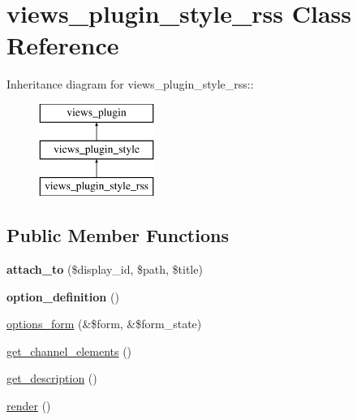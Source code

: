 \hypertarget{classviews__plugin__style__rss}{
\section{views\_\-plugin\_\-style\_\-rss Class Reference}
\label{classviews__plugin__style__rss}
}
Inheritance diagram for views\_\-plugin\_\-style\_\-rss::\begin{figure}[H]
\begin{center}
\leavevmode
\includegraphics[height=3cm]{classviews__plugin__style__rss}
\end{center}
\end{figure}
\subsection*{Public Member Functions}
\begin{DoxyCompactItemize}
\item 
\hypertarget{classviews__plugin__style__rss_a9cd5c1f8c310e28c6e6f99d4fc4ed295}{
{\bfseries attach\_\-to} (\$display\_\-id, \$path, \$title)}
\label{classviews__plugin__style__rss_a9cd5c1f8c310e28c6e6f99d4fc4ed295}

\item 
\hypertarget{classviews__plugin__style__rss_ab65464713d5256b32dbb4eea3e6d76ed}{
{\bfseries option\_\-definition} ()}
\label{classviews__plugin__style__rss_ab65464713d5256b32dbb4eea3e6d76ed}

\item 
\hyperlink{classviews__plugin__style__rss_a317b1867ddd97f969977368031e04fee}{options\_\-form} (\&\$form, \&\$form\_\-state)
\item 
\hyperlink{classviews__plugin__style__rss_afce443c4f7053fc7e9a2043ae0848cd7}{get\_\-channel\_\-elements} ()
\item 
\hyperlink{classviews__plugin__style__rss_a0f17316df765b758ead202868c44ebba}{get\_\-description} ()
\item 
\hyperlink{classviews__plugin__style__rss_aa6331538ac5b9cdc80478f98ba5e0de4}{render} ()
\end{DoxyCompactItemize}


